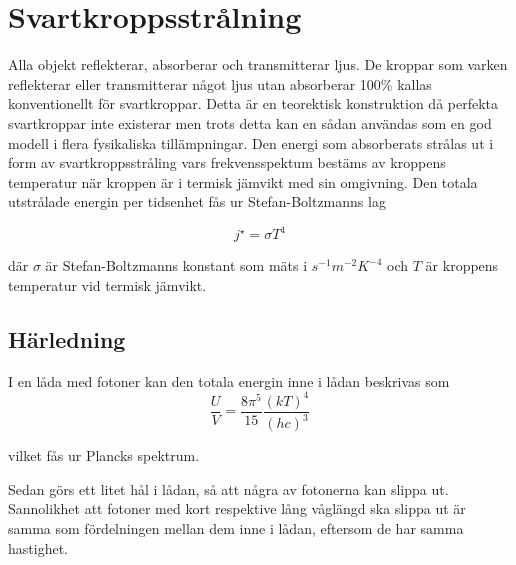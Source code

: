 
\section{Svartkroppsstrålning}
\label{sec:blackbody}

Alla objekt reflekterar, absorberar och transmitterar ljus. De kroppar som varken 
reflekterar eller transmitterar något ljus utan absorberar 100\% kallas konventionellt för 
svartkroppar. Detta är en teorektisk konstruktion då perfekta svartkroppar inte existerar 
men trots detta kan en sådan användas som en god modell i flera fysikaliska 
tillämpningar. Den energi som absorberats strålas ut i form av svartkroppsstråling vars 
frekvensspektum bestäms av kroppens temperatur när kroppen är i termisk jämvikt med
 sin omgivning. Den totala utstrålade energin per tidsenhet fås ur Stefan-Boltzmanns lag
 
\begin{equation}\boxed{ \; \; \;
j^{\star} = \sigma T^{4}
\; \; \; }
\end{equation}

\noindent
där $\sigma$ är Stefan-Boltzmanns konstant som mäts i $\unit{s^{-1}m^{-2}K^{-4}}$ och $T$ är kroppens temperatur vid termisk jämvikt.

\subsection{Härledning}
I en låda med fotoner kan den totala energin inne i lådan beskrivas som 
\begin{equation}
\frac{U}{V}=\frac{8\pi^5}{15}\frac{(kT)^4}{(hc)^3}
\end{equation}

vilket fås ur Plancks spektrum.\cite{schroeder00}

Sedan görs ett litet hål i lådan, så att några av fotonerna kan slippa ut. Sannolikhet att fotoner med kort respektive lång våglängd ska slippa ut är samma som fördelningen mellan dem inne i lådan, eftersom de har samma hastighet.

